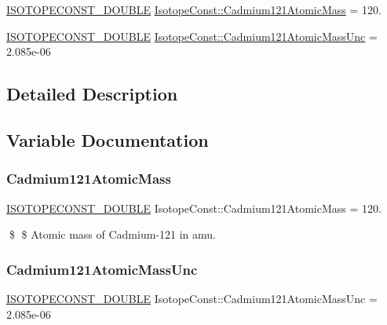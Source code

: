 \begin{DoxyCompactItemize}
\item 
\mbox{\hyperlink{group___isotope_const-_macros_ga8f45a7272ce02c0b4c65c44636ed719a}{I\+S\+O\+T\+O\+P\+E\+C\+O\+N\+S\+T\+\_\+\+D\+O\+U\+B\+LE}} \mbox{\hyperlink{group___isotope_const-_cadmium-_cd121_gac280fc43dc5407897b3cf0171f739640}{Isotope\+Const\+::\+Cadmium121\+Atomic\+Mass}} = 120.
\item 
\mbox{\hyperlink{group___isotope_const-_macros_ga8f45a7272ce02c0b4c65c44636ed719a}{I\+S\+O\+T\+O\+P\+E\+C\+O\+N\+S\+T\+\_\+\+D\+O\+U\+B\+LE}} \mbox{\hyperlink{group___isotope_const-_cadmium-_cd121_gae49bd2ea75340cf4744c7d69679013c9}{Isotope\+Const\+::\+Cadmium121\+Atomic\+Mass\+Unc}} = 2.\+085e-\/06
\end{DoxyCompactItemize}


\subsection{Detailed Description}


\subsection{Variable Documentation}
\mbox{\label{group___isotope_const-_cadmium-_cd121_gac280fc43dc5407897b3cf0171f739640}} 
\subsubsection{\texorpdfstring{Cadmium121\+Atomic\+Mass}{Cadmium121AtomicMass}}
{\footnotesize\ttfamily \mbox{\hyperlink{group___isotope_const-_macros_ga8f45a7272ce02c0b4c65c44636ed719a}{I\+S\+O\+T\+O\+P\+E\+C\+O\+N\+S\+T\+\_\+\+D\+O\+U\+B\+LE}} Isotope\+Const\+::\+Cadmium121\+Atomic\+Mass = 120.}

\$ \$ Atomic mass of Cadmium-\/121 in amu. \mbox{\label{group___isotope_const-_cadmium-_cd121_gae49bd2ea75340cf4744c7d69679013c9}} 
\subsubsection{\texorpdfstring{Cadmium121\+Atomic\+Mass\+Unc}{Cadmium121AtomicMassUnc}}
{\footnotesize\ttfamily \mbox{\hyperlink{group___isotope_const-_macros_ga8f45a7272ce02c0b4c65c44636ed719a}{I\+S\+O\+T\+O\+P\+E\+C\+O\+N\+S\+T\+\_\+\+D\+O\+U\+B\+LE}} Isotope\+Const\+::\+Cadmium121\+Atomic\+Mass\+Unc = 2.\+085e-\/06}

